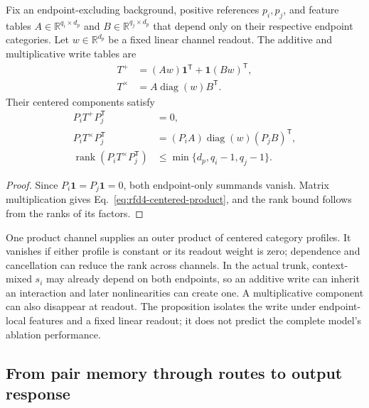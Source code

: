\begin{proposition}
\label{prop:rfd4-centered-write}
Fix an endpoint-excluding background, positive references $p_i,p_j$, and feature tables
$A\in\mathbb R^{q_i\times d_p}$ and $B\in\mathbb R^{q_j\times d_p}$ that depend only on
their respective endpoint categories.  Let $w\in\mathbb R^{d_p}$ be a fixed linear channel
readout.  The additive and multiplicative write tables are
\begin{align}
T^+&=(Aw)\mathbf1^{\mathsf T}+\mathbf1(Bw)^{\mathsf T},\\
T^\times&=A\operatorname{diag}(w)B^{\mathsf T}.
\end{align}
Their centered components satisfy
\begin{align}
P_iT^+P_j^{\mathsf T}&=0,\\
P_iT^\times P_j^{\mathsf T}
&=(P_iA)\operatorname{diag}(w)(P_jB)^{\mathsf T},
\label{eq:rfd4-centered-product}\\
\operatorname{rank}(P_iT^\times P_j^{\mathsf T})
&\leq\min\{d_p,q_i-1,q_j-1\}.
\end{align}
\end{proposition}

\begin{proof}
Since $P_i\mathbf1=P_j\mathbf1=0$, both endpoint-only summands vanish.  Matrix multiplication
gives Eq.~\ref{eq:rfd4-centered-product}, and the rank bound follows from the ranks of its
factors.
\end{proof}

One product channel supplies an outer product of centered category profiles.  It vanishes if
either profile is constant or its readout weight is zero; dependence and cancellation can reduce
the rank across channels.  In the actual trunk, context-mixed $s_i$ may already depend on both
endpoints, so an additive write can inherit an interaction and later nonlinearities can create
one.  A multiplicative component can also disappear at readout.  The proposition isolates the
write under endpoint-local features and a fixed linear readout; it does not predict the complete
model's ablation performance.

\subsection{From pair memory through routes to output response}

